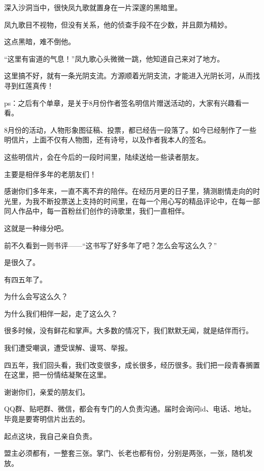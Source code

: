 \begin{this_body}
深入沙洞当中，很快凤九歌就置身在一片深邃的黑暗里。

凤九歌目不视物，但没有关系，他的侦查手段不在少数，并且颇为精妙。

这点黑暗，难不倒他。

“这里有宙道的气息！”凤九歌心头微微一跳，他知道自己来对了地方。

这里搞不好，就有一条光阴支流。方源顺着光阴支流，才能进入光阴长河，从而找寻到红莲真传！

ps：之后有个单章，是关于8月份作者签名明信片赠送活动的，大家有兴趣看一看。

\end{this_body}


\begin{this_body} %

8月份的活动，人物形象图征稿、投票，都已经告一段落了。如今已经制作了一些明信片，上面不仅有人物图，还有诗号，以及作者我本人的签名。

这些明信片，会在今后的一段时间里，陆续送给一些读者朋友。

主要是相伴多年的老朋友们！

感谢你们多年来，一直不离不弃的陪伴。在经历月更的日子里，猜测剧情走向的时光里，为我不断投票送上支持的时间里，在每一个用心写的精品评论中，在每一部同人作品中，每一首粉丝们创作的诗歌里，我们一直相伴。

这就是一种缘分吧。

前不久看到一则书评——“这书写了好多年了吧？怎么会写这么久？”

是很久了。

有四五年了。

为什么会写这么久？

为什么我们相伴一起，走了这么久？

很多时候，没有鲜花和掌声。大多数的情况下，我们默默无闻，就是结伴而行。

我们遭受嘲讽，遭受误解、谩骂、举报。

四五年，我们回头看，我们改变很多，成长很多，经历很多。我们把一段青春搁置在这里，把一份情结凝聚在这里。

谢谢你们，亲爱的朋友们。

QQ群、贴吧群、微信，都会有专门的人负责沟通。届时会询问id、电话、地址。毕竟是要寄明信片出去的。

起点这块，我自己亲自负责。

盟主必须都有，一整套三张。掌门、长老也都有份，分别是两张，一张，随机发放。


\end{this_body}
